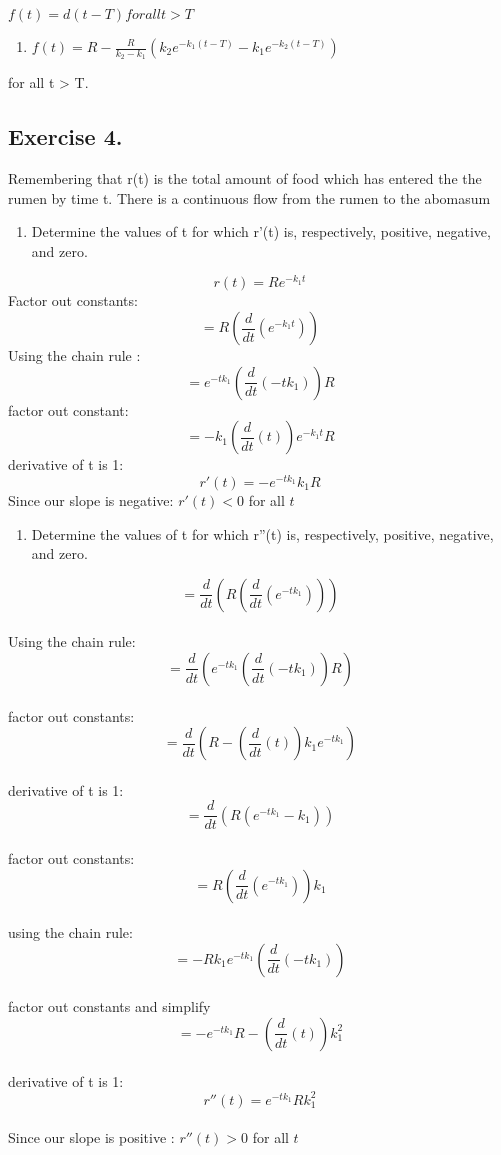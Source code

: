 \documentclass[]{article}
\providecommand{\tightlist}{%
  \setlength{\itemsep}{0pt}\setlength{\parskip}{0pt}}
\begin{document}
\(f(t) = d(t-T) for all t > T\)

\begin{enumerate}
\def\labelenumi{(\arabic{enumi})}
\setcounter{enumi}{9}
\tightlist
\item
  \(f(t) = R - \frac{R}{k_2-k_1}(k_2e^{-k_1(t-T)}-k_1e^{-k_2(t-T)})\)
\end{enumerate}

for all t \textgreater{} T.

\subsection{Exercise 4.}\label{exercise-4.}

Remembering that r(t) is the total amount of food which has entered the
the rumen by time t. There is a continuous flow from the rumen to the
abomasum

\begin{enumerate}
\def\labelenumi{(\alph{enumi})}
\tightlist
\item
  Determine the values of t for which r'(t) is, respectively, positive,
  negative, and zero.
\end{enumerate}

\[r(t) = Re^{-k_1t}\] Factor out constants:
\[=R(\frac{d}{dt}(e^{-k_1 t}))\] Using the chain rule :
\[= e^{-tk_1}(\frac{d}{dt}(-tk_1))R\] factor out constant:
\[=-k_1 (\frac{d}{dt}(t))e^{-k_1 t}R\] derivative of t is 1:
\[r'(t)= -e^{-tk_1}k_1R\] Since our slope is negative: \(r'(t) < 0\) for
all \(t\)

\begin{enumerate}
\def\labelenumi{(\alph{enumi})}
\setcounter{enumi}{1}
\tightlist
\item
  Determine the values of t for which r''(t) is, respectively, positive,
  negative, and zero.
\end{enumerate}

\[= \frac{d}{dt}(R(\frac{d}{dt}(e^{-tk_1})))\]\\
Using the chain rule:
\[= \frac{d}{dt}(e^{-tk_1}(\frac{d}{dt}(-tk_1))R)\]\\
factor out constants:
\[= \frac{d}{dt}(R -(\frac{d}{dt}(t))k_1 e^{-tk_1})\]\\
derivative of t is 1: \[= \frac{d}{dt}(R(e^{-tk_1}-k_1))\]\\
factor out constants: \[= R(\frac{d}{dt}(e^{-tk_1}))k_1\]\\
using the chain rule: \[= -Rk_1e^{-tk_1}(\frac{d}{dt}(-tk_1))\]\\
factor out constants and simplify
\[= -e^{-tk_1}R-(\frac{d}{dt}(t))k_1^2\]\\
derivative of t is 1: \[r''(t)= e^{-tk_1}Rk_1^2\]\\
Since our slope is positive : \(r''(t) > 0\) for all \(t\)
\end{document}
